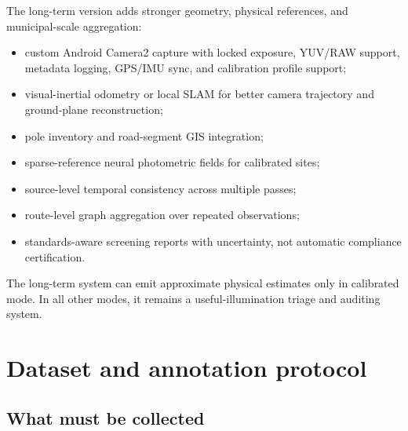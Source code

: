 \documentclass[11pt]{article}
\begin{document}
The long-term version adds stronger geometry, physical references, and municipal-scale aggregation:
\begin{itemize}
  \item custom Android Camera2 capture with locked exposure, YUV/RAW support, metadata logging, GPS/IMU sync, and calibration profile support;
  \item visual-inertial odometry or local SLAM for better camera trajectory and ground-plane reconstruction;
  \item pole inventory and road-segment GIS integration;
  \item sparse-reference neural photometric fields for calibrated sites;
  \item source-level temporal consistency across multiple passes;
  \item route-level graph aggregation over repeated observations;
  \item standards-aware screening reports with uncertainty, not automatic compliance certification.
\end{itemize}

The long-term system can emit approximate physical estimates only in calibrated mode. In all other modes, it remains a useful-illumination triage and auditing system.

\section{Dataset and annotation protocol}

\subsection{What must be collected}
\end{document}

